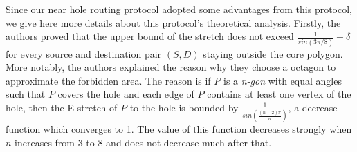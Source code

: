 Since our near hole routing protocol adopted some advantages from this protocol, we give here more details about this protocol's theoretical analysis. Firstly, the authors proved that the upper bound of the stretch does not exceed $\frac{1}{sin(3\pi /8)} + \delta$ for every source and destination pair $(S, D)$ staying outside the core polygon. More notably, the authors explained the reason why they choose a octagon to approximate the forbidden area. The reason is if $P$ is a \emph{n-gon} with equal angles such that $P$ covers the hole and each edge of $P$ contains at least one vertex of the hole, then the E-stretch of $P$ to the hole is bounded by $\frac{1}{sin(\frac{(n-2)\pi}{n})}$, a decrease function which converges to 1. The value of this function decreases strongly when $n$ increases from 3 to 8 and does not decrease much after that.